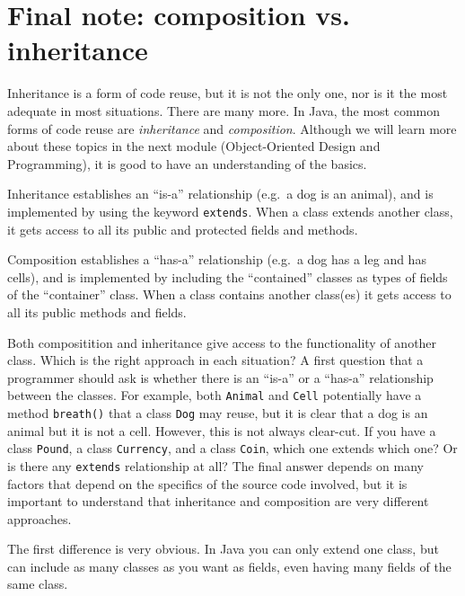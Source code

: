 \section{Final note: composition vs. inheritance}
\label{sec:final-note:-comp}

Inheritance is a form of code reuse, but it is not the only one, nor
is it the most adequate in most situations. There are many more. In
Java, the most common forms of code reuse are \emph{inheritance} and
\emph{composition}. Although we will learn more about these topics in
the next module (Object-Oriented Design and Programming), it is good
to have an understanding of the basics. 

Inheritance establishes an ``is-a'' relationship (e.g.~a dog is 
an animal), and is implemented by
using the keyword \verb+extends+. When a class extends another class,
it gets access to all its public and protected fields and methods. 

Composition establishes a ``has-a'' relationship (e.g.~a dog has a leg
and has cells), and is implemented by including the ``contained''
classes as types of fields of the ``container'' class.  When a class
contains another class(es) it gets access to all its public methods
and fields. 

Both compositition and inheritance give access to the functionality of
another class. Which is the right approach in each situation? A first
question that a programmer should ask is whether there is an ``is-a''
or a ``has-a'' relationship between the classes. For example, both
\verb+Animal+ and \verb+Cell+ potentially have a method
\verb+breath()+ that a class \verb+Dog+ may reuse, but it is clear
that a dog is an animal but it is not a cell. However, this is not
always clear-cut. If you have a class \verb+Pound+, a class
\verb+Currency+, and a class \verb+Coin+, which one extends which one?
Or is there any \verb+extends+ relationship at all? The final answer
depends on many factors that depend on the specifics of the source
code involved, but it is important to understand that inheritance and
composition are very different approaches. 

The first difference is very obvious. In Java you can only extend one
class, but can include as many classes as you want as fields, even
having many fields of the same class. 

